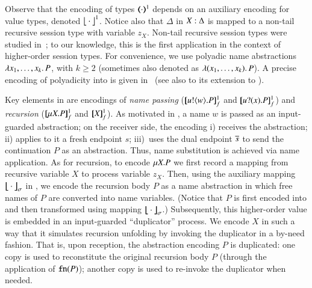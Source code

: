 \documentclass[preprint,11pt]{elsarticle}
\begin{document}
{

Observe that the encoding of types $(\!\!\langle\cdot\rangle\!\!)^{1}$ depends on an auxiliary encoding 
for value types, denoted ${\big\lfloor \cdot\big\rfloor^{1}}$.
Notice also that $\Delta$ in $X:\Delta$ is mapped to a non-tail
recursive session type with variable $z_X$. %
Non-tail
recursive session types {were} studied in~\cite{DBLP:journals/corr/abs-1202-2086,TGC14};
{to our knowledge,}
this is the first application in the
context of higher-order session types.
For convenience,  %
we use polyadic name abstractions $\lambda x_1, \ldots, x_k.\,P$, with $k \geq 2$ (sometimes also denoted as $\lambda (x_1, \ldots, x_k).\,P$).
A precise encoding of polyadicity into \HOp is given in~ (see also  to its extension to \HO).

{Key elements in 
 are encodings of 
{\em name passing} ($[\!\![u ! \langle w \rangle . P]\!\!]^1_f$ and $[\!\![u ? (x) . P]\!\!]^1_f$)  and  
{\em recursion} ($[\!\![\mu X. P]\!\!]^1_f$ and $[\!\![X]\!\!]^1_f$).
As motivated in , %
a name $w$ is passed as an input-guarded abstraction;
on the receiver side,
the encoding %
i) receives
the abstraction; ii) applies to it a fresh  endpoint $s$;
iii)~uses the dual endpoint $\overline{s}$ to send the continuation $P$ as an abstraction.
Thus, name substitution is achieved via name application.
As for recursion, to encode $\mu X. P$ we
first record a mapping from recursive variable $X$ to process variable $z_X$.
Then, using the auxiliary mapping
$\big\lfloor\!\!\big\lfloor\cdot\big\rfloor\!\!\big\rfloor^{}_\sigma$ in 
, we encode the recursion body $P$ as a name abstraction
in which free names of $P$ are converted into name variables.
(Notice that $P$ is first encoded into \HO and then transformed using mapping
$\big\lfloor\!\!\big\lfloor\cdot\big\rfloor\!\!\big\rfloor^{}_\sigma$.)
Subsequently, this higher-order value is embedded in an input-guarded 
``duplicator'' process. We encode $X$ 
in such a way that it
simulates recursion unfolding by 
invoking the duplicator in a by-need fashion.
That is, upon reception, the \HO abstraction encoding  
$P$
is duplicated: 
one copy is used to reconstitute the original recursion body $P$ (through
the application of $\mathtt{fn}(P)$); another copy is used to re-invoke
the duplicator when needed. %

}}
\end{document}
